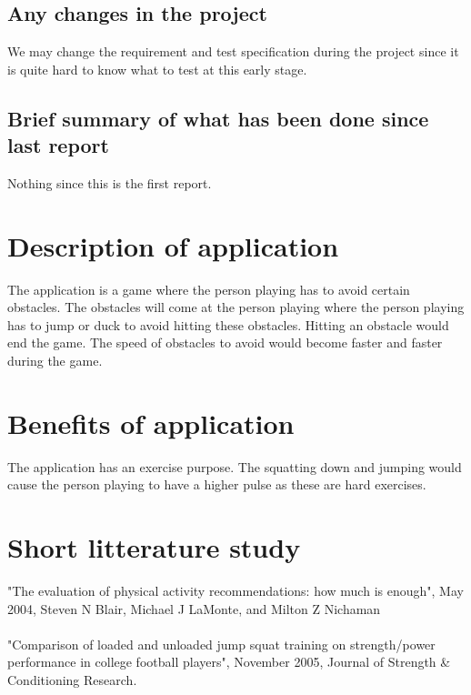 \documentclass[12pt]{report}
\begin{document}
\subsection*{Any changes in the project}
We may change the requirement and test specification during the project since it is quite hard to know what to test at this early stage.

\subsection*{Brief summary of what has been done since last report}
Nothing since this is the first report.

\section*{Description of application}
The application is a game where the person playing has to avoid certain obstacles. The obstacles will come at the person playing where the person playing has to jump or duck to avoid hitting these obstacles. Hitting an obstacle would end the game. The speed of obstacles to avoid would become faster and faster during the game.

\section*{Benefits of application}
The application has an exercise purpose. The squatting down and jumping would cause the person playing to have a higher pulse as these are hard exercises.

\section*{Short litterature study}
"The evaluation of physical activity recommendations: how much is enough", May 2004, Steven N Blair,
Michael J LaMonte, and Milton Z Nichaman\\
${}$\\
"Comparison of loaded and unloaded jump squat training on strength/power performance in college football players", November 2005, Journal of Strength \& Conditioning Research.
\end{document}
